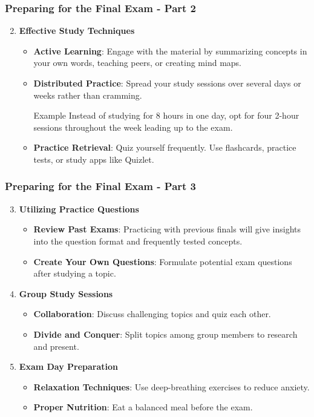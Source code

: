 \documentclass[aspectratio=169]{beamer}
\begin{document}
\begin{frame}[fragile]
    \frametitle{Preparing for the Final Exam - Part 2}
    \begin{enumerate}
        \setcounter{enumi}{1}
        \item \textbf{Effective Study Techniques}
        \begin{itemize}
            \item \textbf{Active Learning}: Engage with the material by summarizing concepts in your own words, teaching peers, or creating mind maps.
            \item \textbf{Distributed Practice}: Spread your study sessions over several days or weeks rather than cramming. 
            \begin{block}{Example}
                Instead of studying for 8 hours in one day, opt for four 2-hour sessions throughout the week leading up to the exam.
            \end{block}
            \item \textbf{Practice Retrieval}: Quiz yourself frequently. Use flashcards, practice tests, or study apps like Quizlet.
        \end{itemize}
    \end{enumerate}
\end{frame}

\begin{frame}[fragile]
    \frametitle{Preparing for the Final Exam - Part 3}
    \begin{enumerate}
        \setcounter{enumi}{2}
        \item \textbf{Utilizing Practice Questions}
        \begin{itemize}
            \item \textbf{Review Past Exams}: Practicing with previous finals will give insights into the question format and frequently tested concepts.
            \item \textbf{Create Your Own Questions}: Formulate potential exam questions after studying a topic.
        \end{itemize}
        
        \item \textbf{Group Study Sessions}
        \begin{itemize}
            \item \textbf{Collaboration}: Discuss challenging topics and quiz each other.
            \item \textbf{Divide and Conquer}: Split topics among group members to research and present.
        \end{itemize}
        
        \item \textbf{Exam Day Preparation}
        \begin{itemize}
            \item \textbf{Relaxation Techniques}: Use deep-breathing exercises to reduce anxiety.
            \item \textbf{Proper Nutrition}: Eat a balanced meal before the exam.
        \end{itemize}
    \end{enumerate}
\end{frame}
\end{document}
